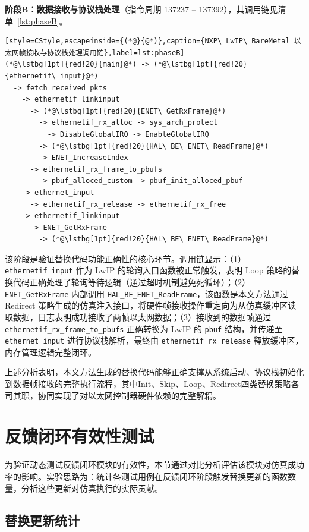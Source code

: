 \textbf{阶段B：数据接收与协议栈处理}（指令周期 137237 -- 137392），其调用链见清单~\ref{lst:phaseB}。
\begin{lstlisting}[style=CStyle,escapeinside={(*@}{@*)},caption={NXP\_LwIP\_BareMetal 以太网帧接收与协议栈处理调用链},label=lst:phaseB]
(*@\lstbg[1pt]{red!20}{main}@*) -> (*@\lstbg[1pt]{red!20}{ethernetif\_input}@*)
  -> fetch_received_pkts
    -> ethernetif_linkinput
      -> (*@\lstbg[1pt]{red!20}{ENET\_GetRxFrame}@*)
        -> ethernetif_rx_alloc -> sys_arch_protect
          -> DisableGlobalIRQ -> EnableGlobalIRQ
        -> (*@\lstbg[1pt]{red!20}{HAL\_BE\_ENET\_ReadFrame}@*)
        -> ENET_IncreaseIndex
      -> ethernetif_rx_frame_to_pbufs
        -> pbuf_alloced_custom -> pbuf_init_alloced_pbuf
    -> ethernet_input
      -> ethernetif_rx_release -> ethernetif_rx_free
    -> ethernetif_linkinput
      -> ENET_GetRxFrame
        -> (*@\lstbg[1pt]{red!20}{HAL\_BE\_ENET\_ReadFrame}@*)
\end{lstlisting}

该阶段是验证替换代码功能正确性的核心环节。调用链显示：（1）\texttt{ethernetif\_input} 作为 LwIP 的轮询入口函数被正常触发，表明 Loop 策略的替换代码正确处理了轮询等待逻辑（通过超时机制避免死循环）；（2）\texttt{ENET\_GetRxFrame} 内部调用 \texttt{HAL\_BE\_ENET\_ReadFrame}，该函数是本文方法通过 Redirect 策略生成的仿真注入接口，将硬件帧接收操作重定向为从仿真缓冲区读取数据，日志表明成功接收了两帧以太网数据；（3）接收到的数据帧通过 \texttt{ethernetif\_rx\_frame\_to\_pbufs} 正确转换为 LwIP 的 \texttt{pbuf} 结构，并传递至 \texttt{ethernet\_input} 进行协议栈解析，最终由 \texttt{ethernetif\_rx\_release} 释放缓冲区，内存管理逻辑完整闭环。

上述分析表明，本文方法生成的替换代码能够正确支撑从系统启动、协议栈初始化到数据帧接收的完整执行流程，其中Init、Skip、Loop、Redirect四类替换策略各司其职，协同实现了对以太网控制器硬件依赖的完整解耦。

\section{反馈闭环有效性测试}
\label{sec:feedback_test}

为验证动态测试反馈闭环模块的有效性，本节通过对比分析评估该模块对仿真成功率的影响。实验思路为：统计各测试用例在反馈闭环阶段触发替换更新的函数数量，分析这些更新对仿真执行的实际贡献。

\subsection{替换更新统计}

